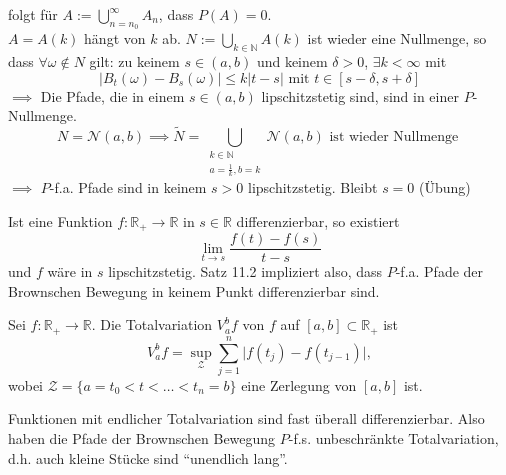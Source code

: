\documentclass[a4paper,twoside,DIV15,BCOR12mm]{scrbook}
\begin{document}
\begin{beweis}
folgt für $A:=\bigcup_{n=n_0}^\infty A_n$, dass $P(A)=0$. \\
$A=A(k)$ hängt von $k$ ab. $N:=\bigcup_{k\in\mathbb N}A(k)$ ist wieder eine Nullmenge, so dass
$\forall \omega\notin N$ gilt: zu keinem $s\in(a,b)$ und keinem $\delta > 0$, $\exists k<\infty$ mit
\[
\vert B_t(\omega)-B_s(\omega)\vert\leq k\vert t-s\vert\text{ mit }t\in[s-\delta,s+\delta]
\]
$\implies$ Die Pfade, die in einem $s\in (a,b)$ lipschitzstetig sind, sind in einer $P$-Nullmenge. \\
 \[ 
N=\mathcal N(a,b)\implies\tilde{N}=\bigcup_{\begin{array}{c} k\in\mathbb N \\ a=\frac{1}{k},b=k \end{array}} \mathcal N(a,b)\text{ ist wieder Nullmenge }
\]
$\implies$ $P$-f.a. Pfade sind in keinem $s>0$ lipschitzstetig. Bleibt $s=0$ (Übung)  

\end{beweis}

\begin{bemerkung}
  Ist eine Funktion $f:\mathbb R_+\longrightarrow\mathbb R$ in $s\in \mathbb R$ differenzierbar, so existiert
\[
\lim_{t\rightarrow s}\frac{f(t)-f(s)}{t-s}
\]
und $f$ wäre in $s$ lipschitzstetig. Satz 11.2 impliziert also, dass $P$-f.a. Pfade der Brownschen Bewegung in keinem Punkt differenzierbar sind.
\end{bemerkung}

\begin{definition}
  Sei $f:\mathbb R_+\longrightarrow\mathbb R$. Die Totalvariation $V_a^b f$ von $f$ auf $[a,b]\subset\mathbb R_+$ ist
\[
V_a^bf=\sup_{\mathcal Z}\sum_{j=1}^n\vert f(t_j)-f(t_{j-1})\vert,
\]
wobei $\mathcal Z=\{a=t_0<t<\dots<t_n=b\}$ eine Zerlegung von $[a,b]$ ist.
\end{definition}

\begin{bemerkung}
  Funktionen mit endlicher Totalvariation sind fast überall differenzierbar. Also haben die Pfade der Brownschen Bewegung $P$-f.s. unbeschränkte Totalvariation, d.h. auch kleine Stücke sind ``unendlich lang''.
\end{bemerkung}
\end{document}
